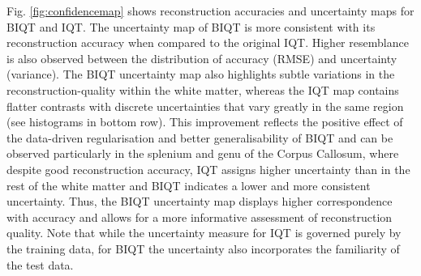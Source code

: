 	
	Fig. \ref{fig:confidencemap} shows reconstruction accuracies and uncertainty maps for BIQT and IQT. The uncertainty map of BIQT is more consistent with its reconstruction accuracy when compared to the original IQT. Higher resemblance is also observed between the distribution of accuracy (RMSE) and uncertainty (variance). The BIQT uncertainty map also highlights subtle variations in the reconstruction-quality within the white matter, whereas the IQT map contains flatter contrasts with discrete uncertainties that vary greatly in the same region (see histograms in bottom row). This improvement reflects the positive effect of the data-driven regularisation and better generalisability of BIQT and can be observed particularly in the splenium and genu of the Corpus Callosum, where despite good reconstruction accuracy, IQT assigns higher uncertainty than in the rest of the white matter and BIQT indicates a lower and more consistent uncertainty. Thus, the BIQT uncertainty map displays higher correspondence with accuracy and allows for a more informative assessment of reconstruction quality. 
	Note that while the uncertainty measure for IQT is governed purely by the training data, for BIQT the uncertainty also incorporates the familiarity of the test data.%
	
